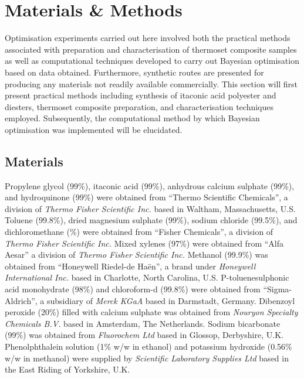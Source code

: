 \section{Materials \& Methods}
Optimisation experiments carried out here involved both the practical 
 methods associated with preparation and characterisation of thermoset 
 composite samples as well as computational techniques developed to carry
 out Bayesian optimisation based
 on data obtained.
Furthermore, synthetic routes are presented for producing any materials
 not readily available commercially.
This section will first present practical methods including
 synthesis of itaconic acid polyester and diesters, thermoset composite
 preparation, and characterisation techniques employed.
Subsequently, the computational method by which Bayesian optimisation was
 implemented will be elucidated.

\subsection{Materials}
Propylene glycol (99\unit{\percent}), itaconic acid
 (99\unit{\percent}), anhydrous calcium sulphate (99\unit{\percent}), and
  hydroquinone (99\unit{\percent}) were obtained from ``Thermo Scientific 
  Chemicals'', a division of \textit{Thermo Fisher Scientific Inc.} based 
  in Waltham, Massachusetts, U.S.
Toluene (99.8\unit{\percent}), dried magnesium sulphate 
 (99\unit{\percent}), sodium chloride (99.5\unit{\percent}), and 
 dichloromethane (\unit{\percent}) were obtained from ``Fisher Chemicals'',
 a division of \textit{Thermo Fisher Scientific Inc.}
Mixed xylenes (97\unit{\percent}) were obtained from ``Alfa Aesar'' a 
 division of \textit{Thermo Fisher Scientific Inc.}
Methanol (99.9\unit{\percent}) was obtained from ``Honeywell Riedel-de 
 Ha\"{e}n'', a brand under \textit{Honeywell International Inc.} based in
 Charlotte, North Carolina, U.S.
P-toluenesulphonic acid monohydrate (98\unit{\percent}) and 
 chloroform-d (99.8\unit{\percent}) were obtained from ``Sigma-Aldrich'', a
 subsidiary of \textit{Merck KGaA} based in Darmstadt, Germany.
Dibenzoyl peroxide (20\unit{\percent}) filled with calcium sulphate was 
 obtained from \textit{Nouryon Specialty Chemicals B.V.} based in Amsterdam,
 The Netherlands.
Sodium bicarbonate (99\unit{\percent}) was obtained from 
 \textit{Fluorochem Ltd} based in Glossop, Derbyshire, U.K.
 Phenolphthalein solution (1\unit{\percent} w/w in ethanol) and potassium
 hydroxide (0.56\unit{\percent} w/w in methanol) were supplied 
 by \textit{Scientific Laboratory Supplies Ltd} based in the East Riding 
 of Yorkshire, U.K.

